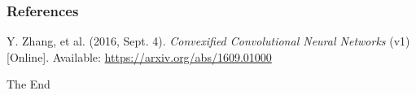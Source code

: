 \documentclass[hyperref={colorlinks}]{beamer}
\begin{document}

\begin{frame}
	\frametitle{References}
	\footnotesize{
		\begin{thebibliography}{9} %
			Y. Zhang, et al. (2016, Sept. 4).
			\emph{Convexified Convolutional Neural Networks} (v1) [Online].
			Available: \url{https://arxiv.org/abs/1609.01000}
		\end{thebibliography}
	}
\end{frame}


\begin{frame}
	\Huge{\centerline{The End}}
\end{frame}
\end{document}
